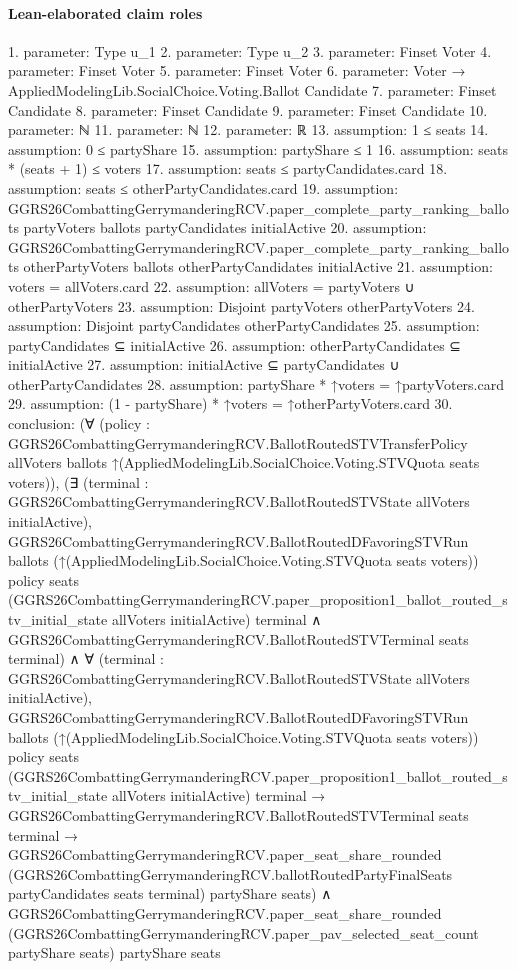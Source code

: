 \documentclass[10pt]{article}
\begin{document}
\paragraph{Lean-elaborated claim roles}\begin{ReviewVerbatim}
1. parameter: Type u_1
2. parameter: Type u_2
3. parameter: Finset Voter
4. parameter: Finset Voter
5. parameter: Finset Voter
6. parameter: Voter → AppliedModelingLib.SocialChoice.Voting.Ballot Candidate
7. parameter: Finset Candidate
8. parameter: Finset Candidate
9. parameter: Finset Candidate
10. parameter: ℕ
11. parameter: ℕ
12. parameter: ℝ
13. assumption: 1 ≤ seats
14. assumption: 0 ≤ partyShare
15. assumption: partyShare ≤ 1
16. assumption: seats * (seats + 1) ≤ voters
17. assumption: seats ≤ partyCandidates.card
18. assumption: seats ≤ otherPartyCandidates.card
19. assumption: GGRS26CombattingGerrymanderingRCV.paper_complete_party_ranking_ballots partyVoters ballots partyCandidates initialActive
20. assumption: GGRS26CombattingGerrymanderingRCV.paper_complete_party_ranking_ballots otherPartyVoters ballots otherPartyCandidates
  initialActive
21. assumption: voters = allVoters.card
22. assumption: allVoters = partyVoters ∪ otherPartyVoters
23. assumption: Disjoint partyVoters otherPartyVoters
24. assumption: Disjoint partyCandidates otherPartyCandidates
25. assumption: partyCandidates ⊆ initialActive
26. assumption: otherPartyCandidates ⊆ initialActive
27. assumption: initialActive ⊆ partyCandidates ∪ otherPartyCandidates
28. assumption: partyShare * ↑voters = ↑partyVoters.card
29. assumption: (1 - partyShare) * ↑voters = ↑otherPartyVoters.card
30. conclusion: (∀
    (policy :
      GGRS26CombattingGerrymanderingRCV.BallotRoutedSTVTransferPolicy allVoters ballots
        ↑(AppliedModelingLib.SocialChoice.Voting.STVQuota seats voters)),
    (∃ (terminal : GGRS26CombattingGerrymanderingRCV.BallotRoutedSTVState allVoters initialActive),
        GGRS26CombattingGerrymanderingRCV.BallotRoutedDFavoringSTVRun ballots
            (↑(AppliedModelingLib.SocialChoice.Voting.STVQuota seats voters)) policy seats
            (GGRS26CombattingGerrymanderingRCV.paper_proposition1_ballot_routed_stv_initial_state allVoters
              initialActive)
            terminal ∧
          GGRS26CombattingGerrymanderingRCV.BallotRoutedSTVTerminal seats terminal) ∧
      ∀ (terminal : GGRS26CombattingGerrymanderingRCV.BallotRoutedSTVState allVoters initialActive),
        GGRS26CombattingGerrymanderingRCV.BallotRoutedDFavoringSTVRun ballots
            (↑(AppliedModelingLib.SocialChoice.Voting.STVQuota seats voters)) policy seats
            (GGRS26CombattingGerrymanderingRCV.paper_proposition1_ballot_routed_stv_initial_state allVoters
              initialActive)
            terminal →
          GGRS26CombattingGerrymanderingRCV.BallotRoutedSTVTerminal seats terminal →
            GGRS26CombattingGerrymanderingRCV.paper_seat_share_rounded
              (GGRS26CombattingGerrymanderingRCV.ballotRoutedPartyFinalSeats partyCandidates seats terminal) partyShare
              seats) ∧
  GGRS26CombattingGerrymanderingRCV.paper_seat_share_rounded
    (GGRS26CombattingGerrymanderingRCV.paper_pav_selected_seat_count partyShare seats) partyShare seats
\end{ReviewVerbatim}
\end{document}
